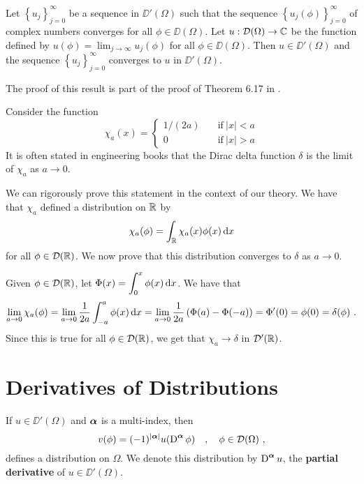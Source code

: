 \begin{prop}
Let $\displaystyle \left\{ u_j \right\}_{j=0}^\infty$ be a sequence
in $\DD'(\Omega)$ such that the sequence
$\displaystyle \left\{ u_j(\phi) \right\}_{j=0}^\infty$ of complex numbers
converges for all $\phi \in \DD(\Omega)$.  Let
$u : \mathcal{D}(\Omega) \to \mathbb{C}$ be the function defined
by $\displaystyle u(\phi) = \lim_{j\to \infty} u_j(\phi)$ for all
$\phi \in \DD(\Omega)$.  Then $u\in \DD'(\Omega)$ and the sequence 
$\displaystyle \left\{ u_j \right\}_{j=0}^\infty$ converges to $u$ in
$\DD'(\Omega)$.
\end{prop}

The proof of this result is part of the proof of Theorem 6.17 in
\cite{RuFA}.

\begin{egg}
Consider the function        \label{chia_delta}
\[
\chi_a(x) =
\begin{cases}
1/(2a) & \quad \text{if} \ |x|<a \\
0 & \quad \text{if} \ |x| >a
\end{cases}
\]
It is often stated in engineering books that the Dirac delta function
$\delta$ is the limit of $\chi_a$ as $a \to 0$.

We can rigorously prove this statement in the context of our theory.
We have that $\chi_a$ defined a distribution on $\mathbb{R}$ by
\[
  \chi_a(\phi) = \int_{\mathbb{R}} \chi_a(x) \phi(x) \,\mathrm{d}{x}
\]
for all $\phi \in \mathcal{D}(\mathbb{R})$.  We now prove that this distribution
converges to $\delta$ as $ a \to 0$.

Given $\phi \in \mathcal{D}(\mathbb{R})$, let
$\displaystyle \Phi(x) = \int_0^x \phi(x) \,\mathrm{d}{x}$.
We have that
\[
\lim_{a\to 0} \chi_a(\phi)
= \lim_{a\to 0}\frac{1}{2a} \int_{-a}^a \phi(x) \,\mathrm{d}{x} 
= \lim_{a\to 0}\frac{1}{2a} \left( \Phi(a) - \Phi(-a)\right)
= \Phi'(0) = \phi(0) = \delta(\phi) \ .
\]
Since this is true for all $\phi \in \mathcal{D}(\mathbb{R})$, we get that
$\chi_a \to \delta$ in $\mathcal{D}'(\mathbb{R})$.
\end{egg}

\section{Derivatives of Distributions}

\begin{prop} \label{distr_der_def}
If $u \in \DD'(\Omega)$ and ${\bm{\alpha}}$ is a multi-index, then
\[
v(\phi) = (-1)^{|{\bm{\alpha}}|}u(\operatorname{D}^{{\bm{\alpha}}} \phi) \quad ,
\quad \phi \in \mathcal{D}(\Omega) \ ,
\]
defines a distribution on $\Omega$.  We denote this distribution by
$\displaystyle \operatorname{D}^{{\bm{\alpha}}} u$, the
{\bfseries partial derivative}
of $u\in \DD'(\Omega)$.
\end{prop}

